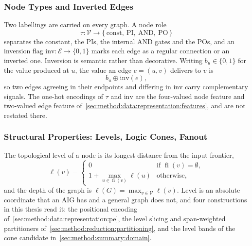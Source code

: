 \subsubsection{Node Types and Inverted Edges}
\label{sec:prelim:aig:nodes}
Two labellings are carried on every graph. A node role
\begin{equation}
    \tau \colon \mathcal{V} \rightarrow
    \{\, \mathrm{const},\ \mathrm{PI},\ \mathrm{AND},\ \mathrm{PO} \,\}
    \label{eq:prelim:role}
\end{equation}
separates the constant, the PIs, the internal AND gates and the POs,
and an inversion flag $\mathrm{inv} \colon \mathcal{E} \rightarrow \{0, 1\}$ marks each edge
as a regular connection or an inverted one. Inversion is semantic rather than decorative.
Writing $b_u \in \{0,1\}$ for the value produced at $u$, the value an edge $e = (u, v)$
delivers to $v$ is
\begin{equation}
    b_u \oplus \mathrm{inv}(e),
    \label{eq:prelim:inversion}
\end{equation}
so two edges agreeing in their endpoints and differing in $\mathrm{inv}$ carry complementary
signals. The one-hot encodings of $\tau$ and $\mathrm{inv}$ are the four-valued node feature
and two-valued edge feature of~\ref{sec:method:data:representation:features}, and are not
restated there.

\subsubsection{Structural Properties: Levels, Logic Cones, Fanout}
\label{sec:prelim:aig:properties}
The topological level of a node is its longest distance from the input frontier,
\begin{equation}
    \ell(v) =
    \begin{cases}
        0 & \text{if } \operatorname{fi}(v) = \emptyset, \\[2pt]
        1 + \max_{u \in \operatorname{fi}(v)} \ell(u) & \text{otherwise,}
    \end{cases}
    \label{eq:prelim:level}
\end{equation}
and the depth of the graph is $\ell(G) = \max_{v \in \mathcal{V}} \ell(v)$. Level is an
absolute coordinate that an AIG has and a general graph does not, and four constructions in
this thesis read it: the positional encoding of~\ref{sec:method:data:representation:pe}, the
level slicing and span-weighted partitioners of~\ref{sec:method:reduction:partitioning}, and
the level bands of the cone candidate in~\ref{sec:method:summary:domain}.

